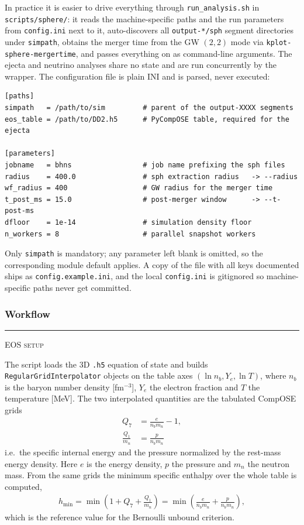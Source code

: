 \documentclass{article}
\newcommand{\var}[1]{%
  {\setlength{\fboxsep}{1.5pt}%
   \colorbox{varbg}{\textcolor{varfg}{\texttt{\small #1}}}}}
\newcommand{\step}[1]{%
  \par\medskip\noindent
  {\color{stepfg}\rule[-0.15ex]{2pt}{1.5ex}\hspace{0.5em}\scshape #1}%
  \hspace{0.75em}\ignorespaces}
\begin{document}
In practice it is easier to drive everything through \var{run\_analysis.sh} in
\var{scripts/sphere/}: it reads the machine-specific paths and the run parameters from
\var{config.ini} next to it, auto-discovers all \var{output-*/sph} segment directories
under \var{simpath}, obtains the merger time from the GW $(2,2)$ mode via
\var{kplot-sphere-mergertime}, and passes everything on as command-line arguments. The
ejecta and neutrino analyses share no state and are run concurrently by the wrapper.
The configuration file is plain INI and is parsed, never executed:
\begin{verbatim}
[paths]
simpath   = /path/to/sim         # parent of the output-XXXX segments
eos_table = /path/to/DD2.h5      # PyCompOSE table, required for the ejecta

[parameters]
jobname   = bhns                 # job name prefixing the sph files
radius    = 400.0                # sph extraction radius   -> --radius
wf_radius = 400                  # GW radius for the merger time
t_post_ms = 15.0                 # post-merger window      -> --t-post-ms
dfloor    = 1e-14                # simulation density floor
n_workers = 8                    # parallel snapshot workers
\end{verbatim}
Only \var{simpath} is mandatory; any parameter left blank is omitted, so the
corresponding module default applies. A copy of the file with all keys documented
ships as \var{config.example.ini}, and the local \var{config.ini} is gitignored so
machine-specific paths never get committed.

\subsubsection*{Workflow}
\step{EOS setup} The script loads the 3D \var{.h5} equation of state and builds
\var{RegularGridInterpolator} objects on the table axes $(\ln n_b, Y_e, \ln T)$,
where $n_b$ is the baryon number density [fm$^{-3}$], $Y_e$ the electron fraction
and $T$ the temperature [MeV]. The two interpolated quantities are the tabulated
CompOSE grids
\begin{align}
  Q_7 &= \frac{e}{n_b m_n}-1,\\
  \frac{Q_1}{m_n} &= \frac{p}{n_b m_n}
\end{align}
i.e.\ the specific internal energy and the pressure normalized by the rest-mass
energy density. Here $e$ is the energy density, $p$ the pressure and $m_n$ the
neutron mass. From the same grids the minimum specific enthalpy over the whole
table is computed,
\begin{align}
  h_{\min}=\min\left(1+Q_7+\frac{Q_1}{m_n}\right)
         =\min\left(\frac{e}{n_b m_n}+\frac{p}{n_b m_n}\right),
\end{align}
which is the reference value for the Bernoulli unbound criterion.
\end{document}
